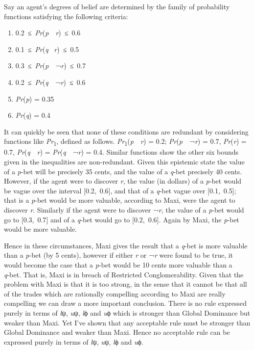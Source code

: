 \documentclass[
  10pt,
  letterpaper,
  DIV=11,
  numbers=noendperiod,
  twoside]{scrartcl}
\providecommand{\tightlist}{%
  \setlength{\itemsep}{0pt}\setlength{\parskip}{0pt}}\usepackage{longtable,booktabs,array}
\begin{document}
Say an agent's degrees of belief are determined by the family of
probability functions satisfying the following criteria:

\begin{enumerate}
\def\labelenumi{\arabic{enumi}.}
\tightlist
\item
  0.2~≤~\emph{Pr}(\emph{p}~\textbar~\emph{r})~≤~0.6
\item
  0.1~≤~\emph{Pr}(\emph{q}~\textbar{} \emph{r})~≤~0.5
\item
  0.3~≤~\emph{Pr}(\emph{p}~\textbar~¬\emph{r})~≤~0.7
\item
  0.2~≤~\emph{Pr}(\emph{q}~\textbar~¬\emph{r})~≤~0.6
\item
  \emph{Pr}(\emph{p}) = 0.35
\item
  \emph{Pr}(\emph{q}) = 0.4
\end{enumerate}

It can quickly be seen that none of these conditions are redundant by
considering functions like \emph{Pr}\textsubscript{1}, defined as
follows. \emph{Pr}\textsubscript{1}(\emph{p}~\textbar~\emph{r}) = 0.2;
\emph{Pr}(\emph{p}~\textbar~¬\emph{r}) = 0.7, \emph{Pr}(\emph{r}) = 0.7,
\emph{Pr}(\emph{q}~\textbar~\emph{r}) =
\emph{Pr}(\emph{q}~\textbar~¬\emph{r}) = 0.4. Similar functions show the
other six bounds given in the inequalities are non-redundant. Given this
epistemic state the value of a \emph{p}‑bet will be precisely 35 cents,
and the value of a \emph{q}‑bet precisely 40 cents. However, if the
agent were to discover \emph{r}, the value (in dollars) of a
\emph{p}‑bet would be vague over the interval {[}0.2,~0.6{]}, and that
of a \emph{q}‑bet vague over {[}0.1,~0.5{]}; that is a \emph{p}‑bet
would be more valuable, according to Maxi, were the agent to discover
\emph{r}. Similarly if the agent were to discover ¬\emph{r}, the value
of a \emph{p}‑bet would go to {[}0.3,~0.7{]} and of a \emph{q}‑bet would
go to {[}0.2,~0.6{]}. Again by Maxi, the \emph{p}‑bet would be more
valuable.

Hence in these circumstances, Maxi gives the result that a \emph{q}‑bet
is more valuable than a \emph{p}‑bet (by 5 cents), however if either
\emph{r} or ¬\emph{r} were found to be true, it would become the case
that a \emph{p}‑bet would be 10 cents more valuable than a \emph{q}‑bet.
That is, Maxi is in breach of Restricted Conglomerability. Given that
the problem with Maxi is that it is too strong, in the sense that it
cannot be that all of the trades which are rationally compelling
according to Maxi are really compelling we can draw a more important
conclusion. There is no rule expressed purely in terms of \emph{l}ψ,
\emph{u}ψ, \emph{l}ϕ and \emph{u}ϕ which is stronger than Global
Dominance but weaker than Maxi. Yet I've shown that any acceptable rule
must be stronger than Global Dominance and weaker than Maxi. Hence no
acceptable rule can be expressed purely in terms of \emph{l}ψ,
\emph{u}ψ, \emph{l}ϕ and \emph{u}ϕ.
\end{document}
